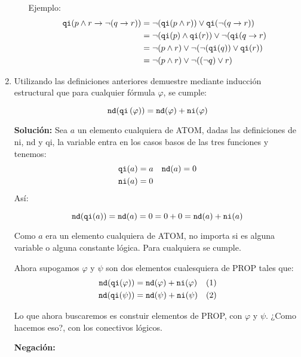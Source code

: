 \documentclass[8pt, letterpaper]{article}
\begin{document}
\begin{enumerate}
\begin{enumerate}
    Ejemplo:
    \begin{align*}
      {\tt qi} (p \land r \to \lnot (q \to r)) &= \neg({\tt qi}(p \land r))
      \lor {\tt qi}(\lnot (q \to r)) \\
      &= \neg({\tt qi}(p) \land {\tt qi}(r)) \lor \neg({\tt qi}(q \to r) \\
      &= \neg(p \land r) \lor \neg(\neg({\tt qi}(q)) \lor {\tt qi}(r))\\
      &= \neg(p \land r) \lor \neg((\neg q) \lor r)\\
    \end{align*}
  \end{enumerate}

  \newpage
  \rmfamily
\item Utilizando las definiciones anteriores demuestre mediante inducción
  estructural que para cualquier fórmula $\varphi$, se cumple:

  $${\tt nd}({\tt qi}\,(\varphi)) = {\tt nd}(\varphi) + {\tt ni}(\varphi)$$

  \ttfamily
  {\bf Solución:}
  \hfill\break
  Sea $a$ un elemento cualquiera de ATOM, dadas las definiciones
  de ni, nd y qi, la variable entra en los casos basos de las tres funciones
  y tenemos:
  \begin{align*}
    {\tt qi}(a) &= a & {\tt nd}(a) &= 0 \\
    {\tt ni}(a) &= 0
  \end{align*}
  Así:

  $${\tt nd}({\tt qi}(a)) = {\tt nd}(a) = 0 = 0 + 0 = {\tt nd}(a) + {\tt ni}
  (a)$$

  Como $a$ era un elemento cualquiera de ATOM, no importa si es alguna variable
  o alguna constante lógica. Para cualquiera se cumple.

  Ahora supogamos $\varphi$ y $\psi$ son dos elementos cualesquiera de PROP
  tales que:
  \begin{align*}
    {\tt nd}({\tt qi}(\varphi)) &= {\tt nd}(\varphi) + {\tt ni}(\varphi) & (1)\\
    {\tt nd}({\tt qi}(\psi)) &= {\tt nd}(\psi) + {\tt ni}(\psi) & (2)
  \end{align*}

  Lo que ahora buscaremos  es constuir elementos de PROP, con $\varphi$ y
  $\psi$. ¿Como hacemos eso?, con los conectivos lógicos.

  \hfill\break
  {\bf Negación:}


\end{enumerate}
\end{document}
